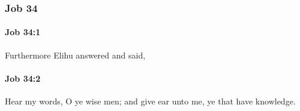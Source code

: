 	\subsubsection{Job 34} %
		\label{JOB-34}

		\paragraph{Job 34:1} %
			\label{JOB-34-1}

			Furthermore Elihu answered and said,


		\paragraph{Job 34:2} %
			\label{JOB-34-2}

			Hear my words, O ye wise men; and give ear unto me, ye that have knowledge.



